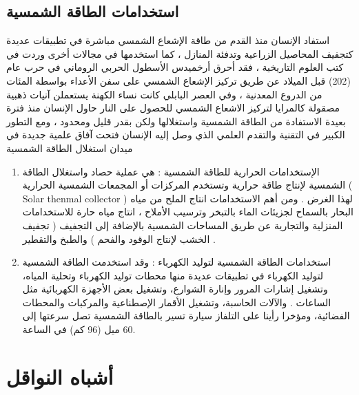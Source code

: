	\subsection{استخدامات الطاقة الشمسية}	
	استفاد الإنسان منذ القدم من طاقة الإشعاع الشمسي مباشرة في تطبيقات عديدة كتجفيف المحاصيل الزراعية وتدفئة المنازل ، كما استخدمها في مجالات أخرى وردت في كتب العلوم التاريخية ، فقد أحرق أرخميدس الأسطول الحربي الروماني في حرب عام (202) قبل الميلاد عن طريق تركيز الإشعاع الشمسي على سفن الأعداء بواسطة المئات من الدروع المعدنية ، وفي العصر البابلي كانت نساء الكهنة يستعملن آنيات ذهبية مصقولة كالمرايا لتركيز الاشعاع الشمسي للحصول على النار 
	حاول الإنسان منذ فترة بعيدة الاستفادة من الطاقة الشمسية واستغلالها ولكن بقدر قليل ومحدود ، ومع التطور الكبير في التقنية والتقدم العلمي الذي وصل إليه الإنسان فتحت آفاق علمية جديدة في ميدان استغلال الطاقة الشمسية
 \cite{a1}
	\begin{enumerate}
		\item الإستخدامات الحرارية للطاقة الشمسية  
		:
		هي عملية حصاد واستغلال الطاقة الشمسية لإنتاج طاقة حرارية وتستخدم المركزات أو المجمعات الشمسية الحرارية ( Solar thenmal collector ) لهذا الغرض .
		ومن أهم الاستخدامات انتاج الملح من مياه البحار بالسماح لجزيئات الماء بالتبخر وترسيب الأملاح ، انتاج مياه حارة للاستخدامات المنزلية والتجارية عن طريق المساحات الشمسية بالإضافة إلى التجفيف ( تجفيف الخشب لإنتاج الوقود والفحم ) والطبخ والتقطير
		.
		 \cite{a4}
		\item استخدامات الطاقة الشمسية لتوليد الكهرباء 
		:
		وقد استخدمت الطاقة الشمسية لتوليد الكهرباء في تطبيقات عديدة منها محطات توليد الكهرباء وتحلية المياه، وتشغيل إشارات المرور وإنارة الشوارع، وتشغيل بعض الأجهزة الكهربائية مثل الساعات . والآلات الحاسبة، وتشغيل الأقمار الإصطناعية والمركبات والمحطات الفضائية، ومؤخرا رأينا على التلفاز سيارة تسير بالطاقة الشمسية تصل سرعتها إلى 60 ميل (96 كم) في الساعة.
	  \cite{a5}
	\end{enumerate}
	\section {أشباه النواقل }
	
